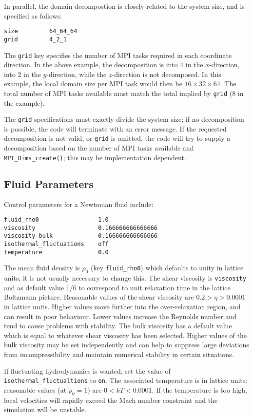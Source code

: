 In parallel, the domain decompostion is closely related to the
system size, and is specified as follows:
\begin{lstlisting}
size         64_64_64
grid         4_2_1
\end{lstlisting}
The \texttt{grid} key specifies the number of MPI tasks required in
each coordinate direction. In the above example, the decomposition
is into 4 in the $x$-direction, into 2 in the $y$-direction, while
the $z$-direction is not decomposed. In this example, the local domain
size per MPI
task would then be $16\times32\times64$. The total number of MPI tasks
available must match the total implied by \texttt{grid} (8 in the
example).

The \texttt{grid} specifications must exactly divide the system size;
if no decomposition is possible, the code will terminate with an error
message.
If the requested decomposition is not valid, or \texttt{grid} is
omitted, the code will try to supply a decomposition based on
the number of MPI tasks available and \texttt{MPI\_Dims\_create()};
this may be implementation dependent.


\subsection{Fluid Parameters}
\label{input-fluid-parameters}

Control parameters for a Newtonian fluid include:
\begin{lstlisting}
fluid_rho0                 1.0
viscosity                  0.166666666666666
viscosity_bulk             0.166666666666666
isothermal_fluctuations    off
temperature                0.0
\end{lstlisting}
The mean fluid density is $\rho_0$ (key \texttt{fluid\_rho0}) which
defaults to unity in lattice units; it is not usually necessary to
change this. The shear viscosity is
\texttt{viscosity} and as default value 1/6 to correspond to
unit relaxation time in the lattice Boltzmann picture. Reasonable
values of the shear viscosity are $0.2 > \eta > 0.0001$ in lattice
units. Higher values move further into the over-relaxation region, and can
result in poor behaviour. Lower
values increase the Reynolds number and tend to cause
problems with stability. The bulk
viscosity has a default value which is equal to whatever shear
viscosity has been selected. Higher values of the bulk viscosity
may be set independently and can help to suppress large deviations
from incompressibility and maintain numerical stability
in certain situations.

If fluctuating hydrodynamics is wanted, set the value of
 \texttt{isothermal\_fluctualtions} to \texttt{on}. The associated
temperature is in lattice units: reasonable values (at $\rho_0 = 1$)
are $0 < kT < 0.0001$. If the temperature is too high, local
velocities will rapidly exceed the Mach number constraint and
the simulation will be unstable.

\vfill
\pagebreak
